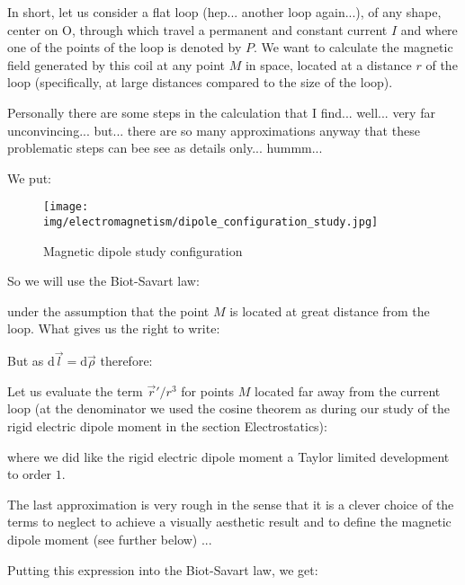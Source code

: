 	In short, let us consider a flat loop (hep... another loop again...), of any shape, center on O, through which travel a permanent and constant current $I$ and where one of the points of the loop is denoted by $P$. We want to calculate the magnetic field generated by this coil at any point $M$ in space, located at a distance $r$ of the loop (specifically, at large distances compared to the size of the loop).
	\begin{tcolorbox}[title=Remark,colframe=black,arc=10pt]
	Personally there are some steps in the calculation that I find... well... very far unconvincing... but... there are so many approximations anyway that these problematic steps can bee see as details only... hummm...
	\end{tcolorbox}
	We put:
	
	\begin{figure}[H]
		\centering
		\texttt{[image: img/electromagnetism/dipole\_configuration\_study.jpg]}
		\caption{Magnetic dipole study configuration}
	\end{figure}
	So we will use the Biot-Savart law:
	
	under the assumption that the point $M$ is located at great distance from the loop. What gives us the right to write:
	
	But as $\mathrm{d}\vec{l}=\mathrm{d}\vec{\rho}$ therefore:
	
	Let us evaluate the term $\vec{r}'/r^3$ for points $M$ located far away from the current loop (at the denominator we used the cosine theorem as during our study of the rigid electric dipole moment in the section Electrostatics):
	
	where we did like the rigid electric dipole moment a Taylor limited development to order $1$. 
	\begin{tcolorbox}[title=Remark,colframe=black,arc=10pt]
	The last approximation is very rough in the sense that it is a clever choice of the terms to neglect to achieve a visually aesthetic result and to define the magnetic dipole moment (see further below) ...
	\end{tcolorbox}
	Putting this expression into the Biot-Savart law, we get:
	
